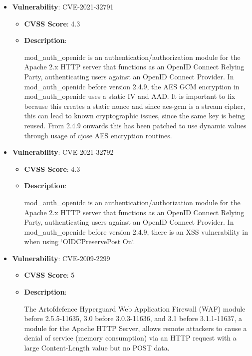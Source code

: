 \documentclass{article}
\begin{document}
\begin{itemize}
        \item \textbf{Vulnerability}: CVE-2021-32791
        \begin{itemize}
            \item \textbf{CVSS Score}:  4.3 
            \item \textbf{Description}:
            \parbox[t]{0.9\linewidth}{
                \ttfamily mod\_auth\_openidc is an authentication/authorization module for the Apache 2.x HTTP server that functions as an OpenID Connect Relying Party, authenticating users against an OpenID Connect Provider. In mod\_auth\_openidc before version 2.4.9, the AES GCM encryption in mod\_auth\_openidc uses a static IV and AAD. It is important to fix because this creates a static nonce and since aes-gcm is a stream cipher, this can lead to known cryptographic issues, since the same key is being reused. From 2.4.9 onwards this has been patched to use dynamic values through usage of cjose AES encryption routines.
            }
        \end{itemize}
    
        \item \textbf{Vulnerability}: CVE-2021-32792
        \begin{itemize}
            \item \textbf{CVSS Score}:  4.3 
            \item \textbf{Description}:
            \parbox[t]{0.9\linewidth}{
                \ttfamily mod\_auth\_openidc is an authentication/authorization module for the Apache 2.x HTTP server that functions as an OpenID Connect Relying Party, authenticating users against an OpenID Connect Provider. In mod\_auth\_openidc before version 2.4.9, there is an XSS vulnerability in when using `OIDCPreservePost On`.
            }
        \end{itemize}
    
        \item \textbf{Vulnerability}: CVE-2009-2299
        \begin{itemize}
            \item \textbf{CVSS Score}:  5 
            \item \textbf{Description}:
            \parbox[t]{0.9\linewidth}{
                \ttfamily The Artofdefence Hyperguard Web Application Firewall (WAF) module before 2.5.5-11635, 3.0 before 3.0.3-11636, and 3.1 before 3.1.1-11637, a module for the Apache HTTP Server, allows remote attackers to cause a denial of service (memory consumption) via an HTTP request with a large Content-Length value but no POST data.
            }
        \end{itemize}
    

\end{itemize}
\end{document}
